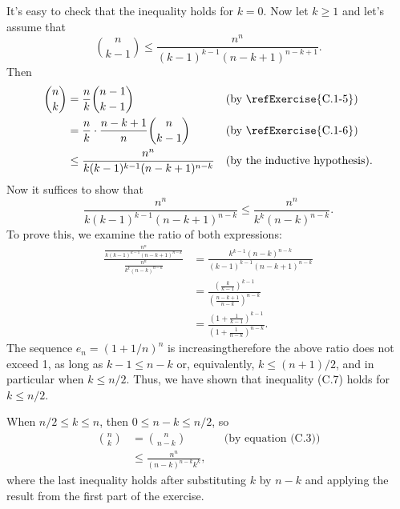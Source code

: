 It's easy to check that the inequality holds for $k=0$.
Now let $k\ge1$ and let's assume that
\[
    \binom{n}{k-1} \le \frac{n^n}{(k-1)^{k-1}(n-k+1)^{n-k+1}}.
\]
Then
\begin{align*}
    \binom{n}{k} &= \frac{n}{k}\binom{n-1}{k-1} && \text{(by \refExercise{C.1-5})} \\
    &= \frac{n}{k}\cdot\frac{n-k+1}{n}\binom{n}{k-1} && \text{(by \refExercise{C.1-6})} \\
    &\le \frac{n^n}{k(k-1)^{k-1}(n-k+1)^{n-k}} && \text{(by the inductive hypothesis)}.
\end{align*}
Now it suffices to show that
\[
    \frac{n^n}{k(k-1)^{k-1}(n-k+1)^{n-k}} \le \frac{n^n}{k^k(n-k)^{n-k}}.
\]
To prove this, we examine the ratio of both expressions:
\begin{align*}
    \frac{\frac{n^n}{k(k-1)^{k-1}(n-k+1)^{n-k}}}{\frac{n^n}{k^k(n-k)^{n-k}}} &= \frac{k^{k-1}(n-k)^{n-k}}{(k-1)^{k-1}(n-k+1)^{n-k}} \\
    &= \frac{\left(\frac{k}{k-1}\right)^{k-1}}{\left(\frac{n-k+1}{n-k}\right)^{n-k}} \\
    &= \frac{\left(1+\frac{1}{k-1}\right)^{k-1}}{\left(1+\frac{1}{n-k}\right)^{n-k}}.
\end{align*}
The sequence $e_n={(1+1/n)}^n$ is increasing\dash therefore the above ratio does not exceed 1, as long as $k-1\le n-k$ or, equivalently, $k\le(n+1)/2$, and in particular when $k\le n/2$.
Thus, we have shown that inequality (C.7) holds for $k\le n/2$.

When $n/2\le k\le n$, then $0\le n-k\le n/2$, so
\begin{align*}
    \binom{n}{k} &= \binom{n}{n-k} && \text{(by equation (C.3))} \\
    &\le \frac{n^n}{(n-k)^{n-k}k^k},
\end{align*}
where the last inequality holds after substituting $k$ by $n-k$ and applying the result from the first part of the exercise.

